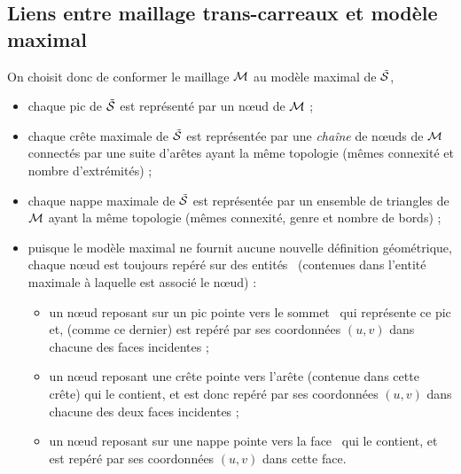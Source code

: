 \subsection{Liens entre maillage trans-carreaux et modèle maximal}
On choisit donc de conformer le maillage $\mathcal{M}$ au modèle maximal de $\tilde{\mathcal{S}}$, \ie
    \begin{itemize}
        \item chaque pic de $\tilde{\mathcal{S}}$ est représenté par un n\oe ud de $\mathcal{M}$ ;
        \item chaque crête maximale de $\tilde{\mathcal{S}}$ est représentée par une \textit{chaîne} de n\oe uds de $\mathcal{M}$ connectés par une suite d'arêtes ayant la même topologie (\ie mêmes connexité et nombre d'extrémités) ;
        \item chaque nappe maximale de $\tilde{\mathcal{S}}$ est représentée par un ensemble de triangles de $\mathcal{M}$ ayant la même topologie (\ie mêmes connexité, genre et nombre de bords) ;
        \item puisque le modèle maximal ne fournit aucune nouvelle définition géométrique, chaque n\oe ud est toujours repéré sur des entités \brep\ (contenues dans l'entité maximale à laquelle est associé le n\oe ud) :
        \begin{itemize}
            \item un n\oe ud reposant sur un pic pointe vers le sommet \brep\ qui représente ce pic et, (comme ce dernier) est repéré par ses coordonnées $(u,v)$ dans chacune des faces incidentes ;%
            \item un n\oe ud reposant une crête pointe vers l'arête (contenue dans cette crête) qui le contient, et est donc repéré par ses coordonnées $(u,v)$ dans chacune des deux faces incidentes ;
            \item un n\oe ud reposant sur une nappe pointe vers la face \brep\ qui le contient, et est repéré par ses coordonnées $(u,v)$ dans cette face.
        \end{itemize}
    \end{itemize}


